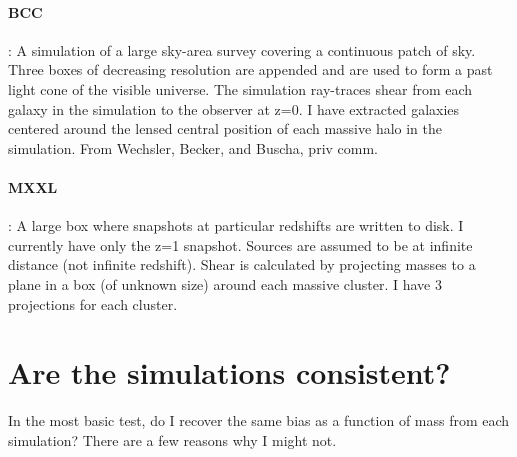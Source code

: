 \documentclass[11pt]{article}
\begin{document}
\paragraph{BCC} : A simulation of a large sky-area survey covering a continuous patch of sky. Three boxes of decreasing resolution are appended and are used to form a past light cone of the visible universe. The simulation ray-traces shear from each galaxy in the simulation to the observer at z=0. I have extracted galaxies centered around the lensed central position of each massive halo in the simulation. From Wechsler, Becker, and Buscha, priv comm.

\paragraph{MXXL}: A large box where snapshots at particular redshifts are written to disk. I currently have only the z=1 snapshot. Sources are assumed to be at infinite distance (not infinite redshift). Shear is calculated by projecting masses to a plane in a box (of unknown size) around each massive cluster. I have 3 projections for each cluster.


\clearpage \newpage


\section{Are the simulations consistent?}

In the most basic test, do I recover the same bias as a function of mass from each simulation? There are a few reasons why I might not. 
\end{document}
